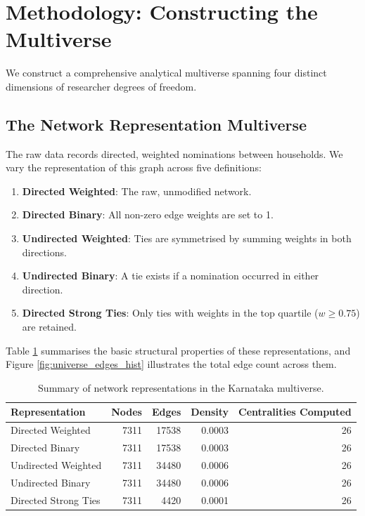 \documentclass[11pt,a4paper]{article}
\begin{document}
\section{Methodology: Constructing the Multiverse}

We construct a comprehensive analytical multiverse spanning four distinct dimensions of researcher degrees of freedom.

\subsection{The Network Representation Multiverse}
The raw data records directed, weighted nominations between households. We vary the representation of this graph across five definitions:
\begin{enumerate}
    \item \textbf{Directed Weighted}: The raw, unmodified network.
    \item \textbf{Directed Binary}: All non-zero edge weights are set to 1.
    \item \textbf{Undirected Weighted}: Ties are symmetrised by summing weights in both directions.
    \item \textbf{Undirected Binary}: A tie exists if a nomination occurred in either direction.
    \item \textbf{Directed Strong Ties}: Only ties with weights in the top quartile ($w \ge 0.75$) are retained.
\end{enumerate}

Table \ref{tab:universe_summary} summarises the basic structural properties of these representations, and Figure \ref{fig:universe_edges_hist} illustrates the total edge count across them.

\begin{table}[H]
\centering
\caption{Summary of network representations in the Karnataka multiverse.}
\label{tab:universe_summary}
\begin{tabular}{lrrrr}
\toprule
Representation & Nodes & Edges & Density & Centralities Computed \\
\midrule
Directed Weighted     & 7311 & 17538 & 0.0003 & 26 \\
Directed Binary       & 7311 & 17538 & 0.0003 & 26 \\
Undirected Weighted   & 7311 & 34480 & 0.0006 & 26 \\
Undirected Binary     & 7311 & 34480 & 0.0006 & 26 \\
Directed Strong Ties  & 7311 &  4420 & 0.0001 & 26 \\
\bottomrule
\end{tabular}
\end{table}
\end{document}
